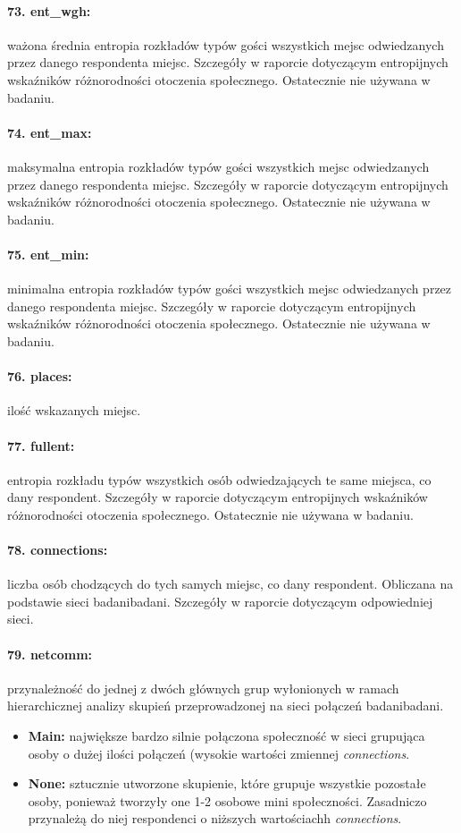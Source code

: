 \documentclass[10pt, a4paper]{article}
\begin{document}
\paragraph{73. ent\_wgh:} ważona średnia entropia rozkładów typów gości wszystkich mejsc odwiedzanych przez danego respondenta miejsc. Szczegóły w raporcie dotyczącym entropijnych wskaźników różnorodności otoczenia społecznego. Ostatecznie nie używana w badaniu.
\paragraph{74. ent\_max:} maksymalna entropia rozkładów typów gości wszystkich mejsc odwiedzanych przez danego respondenta miejsc. Szczegóły w raporcie dotyczącym entropijnych wskaźników różnorodności otoczenia społecznego. Ostatecznie nie używana w badaniu.
\paragraph{75. ent\_min:} minimalna entropia rozkładów typów gości wszystkich mejsc odwiedzanych przez danego respondenta miejsc. Szczegóły w raporcie dotyczącym entropijnych wskaźników różnorodności otoczenia społecznego. Ostatecznie nie używana w badaniu.
\paragraph{76. places:} ilość wskazanych miejsc.
\paragraph{77. fullent:} entropia rozkładu typów wszystkich osób odwiedzających te same miejsca, co dany respondent. Szczegóły w raporcie dotyczącym entropijnych wskaźników różnorodności otoczenia społecznego. Ostatecznie nie używana w badaniu.
\paragraph{78. connections:} liczba osób chodzących do tych samych miejsc, co dany respondent. Obliczana na podstawie sieci badani\textendash badani. Szczegóły w raporcie dotyczącym odpowiedniej sieci.
\paragraph{79. netcomm:} przynależność do jednej z dwóch głównych grup wyłonionych w ramach hierarchicznej analizy skupień przeprowadzonej na sieci połączeń badani\textendash badani.
\begin{itemize}
	\item {\bf Main:} największe bardzo silnie połączona społeczność w sieci grupująca osoby o dużej ilości połączeń (wysokie wartości zmiennej {\it connections}.
	\item {\bf None:} sztucznie utworzone skupienie, które grupuje wszystkie pozostałe osoby, ponieważ tworzyły one 1-2 osobowe mini społeczności. Zasadniczo przynależą do niej respondenci o niższych wartościachh {\it connections}.
\end{itemize}
\end{document}
